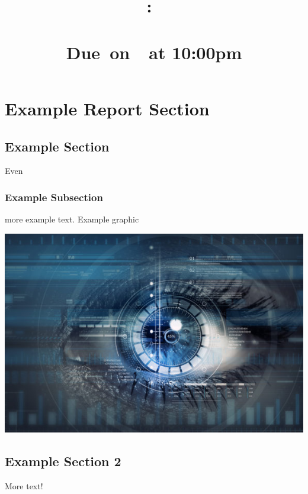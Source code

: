 \documentclass[openright]{report}
\title{
    \vspace{2in}
    \LARGE{\textbf{\projectTitle}}\\
    \vspace{0.1in}\large{\reportClass:\ \reportTopic}\\
    \vspace{0.1in}\large{\reportClassInstructor}\\
    \normalsize\vspace{0.1in}\large{Due\ on\ \reportDueDate\ at 10:00pm}
    \vspace{1.4in}
}
\author{\reportAuthorName}
\date{}
\begin{document}
\maketitle

\large{\tableofcontents}

\chapter{Example Report Section}

\section{Example Section}

\par Even

\subsection{Example Subsection}

\par more example text\cite{citationexample}. Example graphic

\begin{center}
    \includegraphics[scale=1]{images/cyber.jpg}
\end{center}

\section{Example Section 2}

\par More text!




\listoffigures
\cleardoublepage
\end{document}
